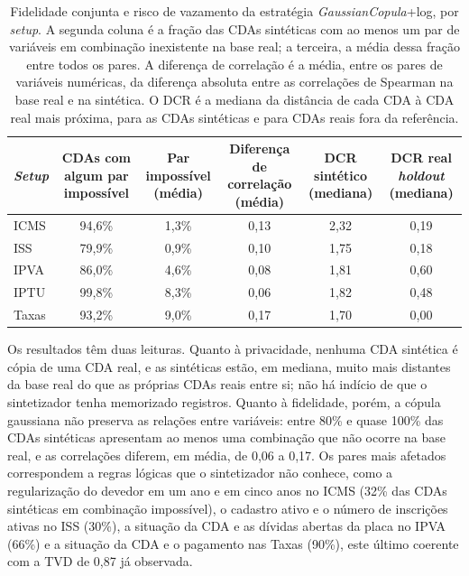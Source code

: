 \begin{table}[H]
    \centering
    \caption[Fidelidade conjunta e risco de vazamento dos dados sintéticos]{Fidelidade conjunta e risco de vazamento da estratégia \textit{GaussianCopula}+log, por \textit{setup}. A segunda coluna é a fração das CDAs sintéticas com ao menos um par de variáveis em combinação inexistente na base real; a terceira, a média dessa fração entre todos os pares. A diferença de correlação é a média, entre os pares de variáveis numéricas, da diferença absoluta entre as correlações de Spearman na base real e na sintética. O DCR é a mediana da distância de cada CDA à CDA real mais próxima, para as CDAs sintéticas e para CDAs reais fora da referência.}
    \label{tab:fidelidade_conjunta}
    \small
    \renewcommand{\arraystretch}{1.2}
    \begin{tabularx}{\textwidth}{>{\raggedright\arraybackslash}p{1.6cm}CCCCC}
        \toprule
        \textbf{\textit{Setup}} & \textbf{CDAs com algum par impossível} & \textbf{Par impossível (média)} & \textbf{Diferença de correlação (média)} & \textbf{DCR sintético (mediana)} & \textbf{DCR real \textit{holdout} (mediana)} \\
        \midrule
        ICMS  & 94,6\% & 1,3\% & 0,13 & 2,32 & 0,19 \\
        ISS   & 79,9\% & 0,9\% & 0,10 & 1,75 & 0,18 \\
        IPVA  & 86,0\% & 4,6\% & 0,08 & 1,81 & 0,60 \\
        IPTU  & 99,8\% & 8,3\% & 0,06 & 1,82 & 0,48 \\
        Taxas & 93,2\% & 9,0\% & 0,17 & 1,70 & 0,00 \\
        \bottomrule
    \end{tabularx}
\end{table}

Os resultados têm duas leituras. Quanto à privacidade, nenhuma CDA sintética é cópia de uma CDA real, e as sintéticas estão, em mediana, muito mais distantes da base real do que as próprias CDAs reais entre si; não há indício de que o sintetizador tenha memorizado registros. Quanto à fidelidade, porém, a cópula gaussiana não preserva as relações entre variáveis: entre 80\% e quase 100\% das CDAs sintéticas apresentam ao menos uma combinação que não ocorre na base real, e as correlações diferem, em média, de 0,06 a 0,17. Os pares mais afetados correspondem a regras lógicas que o sintetizador não conhece, como a regularização do devedor em um ano e em cinco anos no ICMS (32\% das CDAs sintéticas em combinação impossível), o cadastro ativo e o número de inscrições ativas no ISS (30\%), a situação da CDA e as dívidas abertas da placa no IPVA (66\%) e a situação da CDA e o pagamento nas Taxas (90\%), este último coerente com a TVD de 0,87 já observada.

